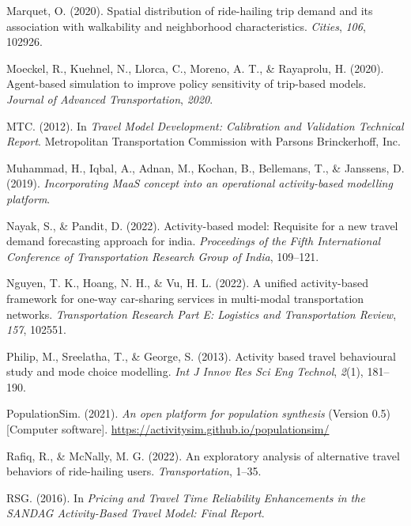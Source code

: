\documentclass[fancy, masters]{byuthesis}
\newlength{\cslhangindent}
\newlength{\cslentryspacingunit} %
\newenvironment{CSLReferences}[2] %
 {%
  \setlength{\parindent}{0pt}
  \ifodd #1
  \let\oldpar\par
  \def\par{\hangindent=\cslhangindent\oldpar}
  \fi
  \setlength{\parskip}{#2\cslentryspacingunit}
 }%
 {}
\begin{document}
\begin{CSLReferences}{1}{0}
\leavevmode{}%
Marquet, O. (2020). Spatial distribution of ride-hailing trip demand and its association with walkability and neighborhood characteristics. \emph{Cities}, \emph{106}, 102926.

\leavevmode{}%
Moeckel, R., Kuehnel, N., Llorca, C., Moreno, A. T., \& Rayaprolu, H. (2020). Agent-based simulation to improve policy sensitivity of trip-based models. \emph{Journal of Advanced Transportation}, \emph{2020}.

\leavevmode{}%
MTC. (2012). In \emph{Travel Model Development: Calibration and Validation Technical Report}. Metropolitan Transportation Commission with Parsons Brinckerhoff, Inc.

\leavevmode{}%
Muhammad, H., Iqbal, A., Adnan, M., Kochan, B., Bellemans, T., \& Janssens, D. (2019). \emph{Incorporating MaaS concept into an operational activity-based modelling platform}.

\leavevmode{}%
Nayak, S., \& Pandit, D. (2022). Activity-based model: Requisite for a new travel demand forecasting approach for india. \emph{Proceedings of the Fifth International Conference of Transportation Research Group of India}, 109--121.

\leavevmode{}%
Nguyen, T. K., Hoang, N. H., \& Vu, H. L. (2022). A unified activity-based framework for one-way car-sharing services in multi-modal transportation networks. \emph{Transportation Research Part E: Logistics and Transportation Review}, \emph{157}, 102551.

\leavevmode{}%
Philip, M., Sreelatha, T., \& George, S. (2013). Activity based travel behavioural study and mode choice modelling. \emph{Int J Innov Res Sci Eng Technol}, \emph{2}(1), 181--190.

\leavevmode{}%
PopulationSim. (2021). \emph{An open platform for population synthesis} (Version 0.5) {[}Computer software{]}. \url{https://activitysim.github.io/populationsim/}

\leavevmode{}%
Rafiq, R., \& McNally, M. G. (2022). An exploratory analysis of alternative travel behaviors of ride-hailing users. \emph{Transportation}, 1--35.

\leavevmode{}%
RSG. (2016). In \emph{Pricing and Travel Time Reliability Enhancements in the SANDAG Activity-Based Travel Model: Final Report}.


\end{CSLReferences}
\end{document}
